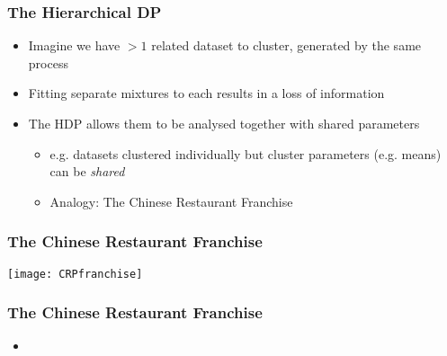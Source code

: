 
\begin{frame}
	\frametitle{The Hierarchical DP}
	\begin{itemize}
		\item Imagine we have $>1$ related dataset to cluster, generated by the same process
		\item Fitting separate mixtures to each results in a loss of information
		\item The \ac{HDP} allows them to be analysed together with shared parameters
		\begin{itemize}
			\item e.g. datasets clustered individually but cluster parameters (e.g. means) can be \emph{shared}
			\item Analogy: The Chinese Restaurant Franchise
		\end{itemize}
	\end{itemize}
\end{frame}

\begin{frame}
	\frametitle{The Chinese Restaurant Franchise}
	\texttt{[image: CRPfranchise]}
\end{frame}

\begin{frame}
	\frametitle{The Chinese Restaurant Franchise}
	\begin{itemize}
		\item 
	\end{itemize}
\end{frame}